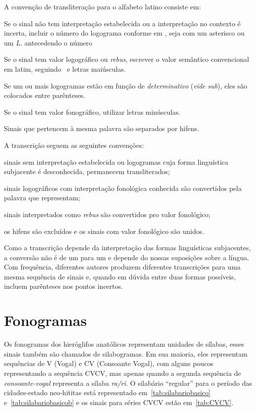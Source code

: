 \noindent A convenção de transliteração para o alfabeto latino consiste em:
\noprelistbreak%
\begin{compactenum}
	\item Se o sinal não tem interpretação estabelecida ou a interpretação no
	contexto é incerta, incluir o número do logograma conforme em
	\citet{LarocheHH}, seja com um asterisco ou um \emph{L.} antecedendo o
	número
	\item Se o sinal tem valor logográfico ou \emph{rebus},
	escrever o valor semântico convencional em latim,
	seguindo~\citet{LarocheHH} e letras maiúsculas.
	\item Se um ou mais logogramas estão em função de \emph{determinativo}
	(\emph{vide sub}), eles são colocados entre parênteses.
	\item Se o sinal tem valor fonográfico, utilizar letras minúsculas.
	\item Sinais que pertencem à mesma palavra são separados por hifens.
\end{compactenum}
A transcrição seguem as seguintes convenções:
\begin{compactenum}
	\item sinais sem interpretação estabelecida ou logogramas cuja forma linguística
	subjacente é desconhecida, permanecem transliterados;
	\item sinais logográficos com interpretação fonológica conhecida são convertidos pela
	palavra que representam;
	\item sinais interpretados como \emph{rebus} são convertidos pro valor
	fonológico;
	\item os hifens são excluídos e os sinais com valor fonológico são unidos.
\end{compactenum}
Como a transcrição depende da interpretação das formas linguísticas subjacentes,
a conversão não é de um para um e depende do nossas suposições sobre a língua.
Com frequência, diferentes autores produzem diferentes transcrições para uma mesma
sequência de sinais e, quando em dúvida entre duas formas possíveis, incluem
parênteses nos pontos incertos.

\section{Fonogramas}

Os fonogramas dos hieróglifos anatólicos representam unidades de sílabas,
esses sinais também são chamados de silabogramas.
Em sua maioria, eles representam sequências de V (Vogal) e CV (Consoante Vogal),
com alguns poucos representando a sequência CVCV, mas apenas quando a segunda
sequência de \emph{consoante\hyp{}vogal} representa a sílaba \emph{ra\slash{}ri}.\@
O silabário ``regular'' para o período das cidades-estado neo-hititas está
representado em~\autoref{tab:silabariobasico} e~\autoref{tab:silabariobasicob} e
os sinais para séries CVCV estão em~\autoref{tab:CVCV}.

